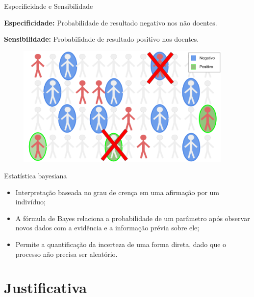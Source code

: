 \documentclass{beamer}
\newcommand{\Space}{\vspace{3ex}}
\begin{document}
\begin{frame}{Especificidade e Sensibilidade}

  {\bf Especificidade:} Probabilidade de resultado negativo nos não doentes.

  \vspace{2mm}
  {\bf Sensibilidade:} Probabilidade de resultado positivo nos doentes.
  \begin{figure}
    \centering
    \includegraphics[width=0.95\textwidth]{../../images/prevalence-4.png}
  \end{figure}
\end{frame}

\begin{frame}{Estatística bayesiana}

  \begin{itemize}
    \item Interpretação baseada no grau de crença em uma afirmação por um
    indivíduo;

    \Space

    \item A fórmula de Bayes relaciona a probabilidade de um parâmetro após
    observar novos dados com a evidência e a informação prévia sobre ele;

    \Space

    \item Permite a quantificação da incerteza de uma forma direta, dado que o
    processo não precisa ser aleatório.
  \end{itemize}

\end{frame}


\section{Justificativa}
\end{document}
